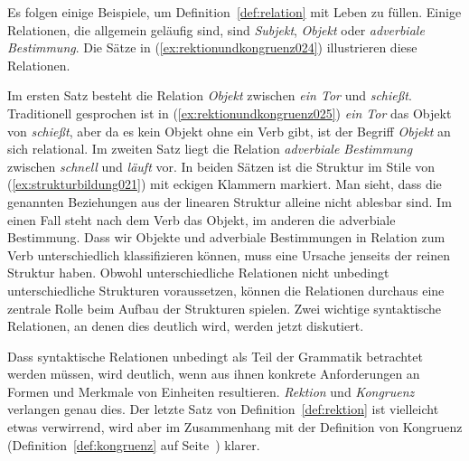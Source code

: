 
Es folgen einige Beispiele, um Definition~\ref{def:relation} mit Leben zu füllen.
Einige Relationen, die allgemein geläufig sind, sind \textit{Subjekt}, \textit{Objekt} oder \textit{adverbiale Bestimmung}.
Die Sätze in (\ref{ex:rektionundkongruenz024}) illustrieren diese Relationen.

\begin{exe}
  \ex\label{ex:rektionundkongruenz024}
  \begin{xlist}
  \end{xlist}
\end{exe}

Im ersten Satz besteht die Relation \textit{Objekt} zwischen \textit{ein Tor} und \textit{schießt}.
Traditionell gesprochen ist in (\ref{ex:rektionundkongruenz025}) \textit{ein Tor} das Objekt von \textit{schießt}, aber da es kein Objekt ohne ein Verb gibt, ist der Begriff \textit{Objekt} an sich relational.
Im zweiten Satz liegt die Relation \textit{adverbiale Bestimmung} zwischen \textit{schnell} und \textit{läuft} vor.
In beiden Sätzen ist die Struktur im Stile von (\ref{ex:strukturbildung021}) mit eckigen Klammern markiert.
Man sieht, dass die genannten Beziehungen aus der linearen Struktur alleine nicht ablesbar sind.
Im einen Fall steht nach dem Verb das Objekt, im anderen die adverbiale Bestimmung.
Dass wir Objekte und adverbiale Bestimmungen in Relation zum Verb unterschiedlich klassifizieren können, muss eine Ursache jenseits der reinen Struktur haben.
Obwohl unterschiedliche Relationen nicht unbedingt unterschiedliche Strukturen voraussetzen, können die Relationen durchaus eine zentrale Rolle beim Aufbau der Strukturen spielen.
Zwei wichtige syntaktische Relationen, an denen dies deutlich wird, werden jetzt diskutiert.

Dass syntaktische Relationen unbedingt als Teil der Grammatik betrachtet werden müssen, wird deutlich, wenn aus ihnen konkrete Anforderungen an Formen und Merkmale von Einheiten resultieren.
\textit{Rektion} und \textit{Kongruenz} verlangen genau dies.
Der letzte Satz von Definition~\ref{def:rektion} ist vielleicht etwas verwirrend, wird aber im Zusammenhang mit der Definition von Kongruenz (Definition~\ref{def:kongruenz} auf Seite~\pageref{def:kongruenz}) klarer.

